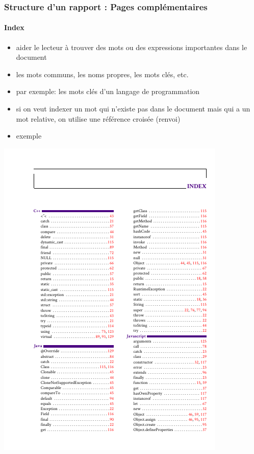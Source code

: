 \documentclass[xcolor=table]{beamer}
\begin{document}
\begin{frame}
\frametitle{Structure d'un rapport : Pages complémentaires}
\framesubtitle{Index}

\begin{minipage}{0.60\textwidth}
	\begin{itemize}
		\item aider le lecteur à trouver des mots ou des expressions importantes dans le document
		\item les mots communs, les noms propres, les mots clés, etc. 
		\item par exemple: les mots clés d'un langage de programmation 
		\item si on veut indexer un mot qui n'existe pas dans le document mais qui a un mot relative, on utilise une référence croisée (renvoi) 
		\item exemple 
	\end{itemize}
\end{minipage}
\begin{minipage}{0.38\textwidth}
	\includegraphics[width=\textwidth,frame]{..//img/Bweb03-redaction/index.png}
\end{minipage}

\end{frame}
\end{document}
